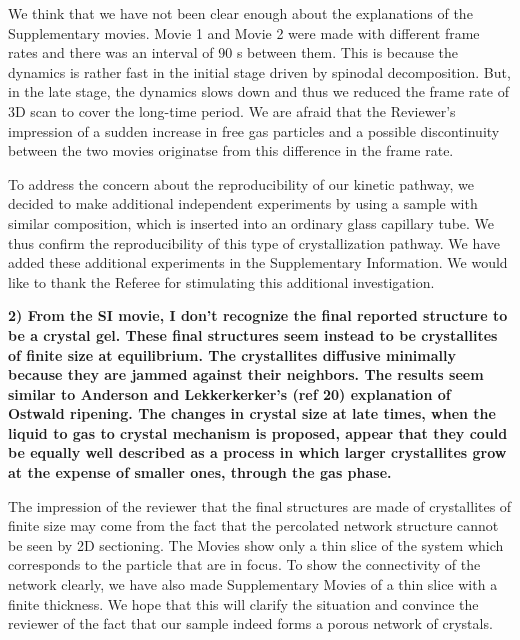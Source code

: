 \documentclass[11pt]{article}
\begin{document}
\bigskip
\doublespacing


We think that we have not been clear enough about the explanations of the Supplementary movies. Movie 1 and Movie 2 were made with different frame rates and there was an interval of 90 s between them. This is because the dynamics is rather fast in the initial stage driven by spinodal decomposition. But, in the late stage, the dynamics slows down and thus we reduced the frame rate of 3D scan to cover the long-time period. We are afraid that the Reviewer’s impression of a sudden increase in free gas particles and a possible discontinuity between the two movies originatse from this difference in the frame rate.

To address the concern about the reproducibility of our kinetic pathway, we decided to make additional independent experiments
by using a sample with similar composition, which is inserted into an ordinary glass capillary tube. We thus confirm the reproducibility of this type of crystallization pathway. We have added these additional experiments in the Supplementary Information. We would like to thank the Referee for stimulating
this additional investigation.


\vspace{1em}

\singlespacing

{\bf
2) From the SI movie, I don't recognize the final reported structure to be a crystal gel. These final structures seem instead to be crystallites of finite size at equilibrium. The crystallites diffusive minimally because they are jammed against their neighbors. The results seem similar to Anderson and Lekkerkerker's (ref 20) explanation of Ostwald ripening. The changes in crystal size at late times, when the liquid to gas to crystal mechanism is proposed, appear that they could be equally well described as a process in which larger crystallites grow at the expense of smaller ones, through the gas phase.

}



\bigskip
\doublespacing

The impression of the reviewer that the final structures are made of crystallites of finite size may come from the fact that the percolated network structure cannot be seen by 2D sectioning. The Movies show only a thin slice of the system which corresponds to the particle that are in focus.
To show the connectivity of the network clearly, we have also made Supplementary Movies of a thin slice with a finite thickness. We hope that this will clarify the situation and convince the reviewer of the fact that our sample indeed forms a porous network of crystals. 
\end{document}
